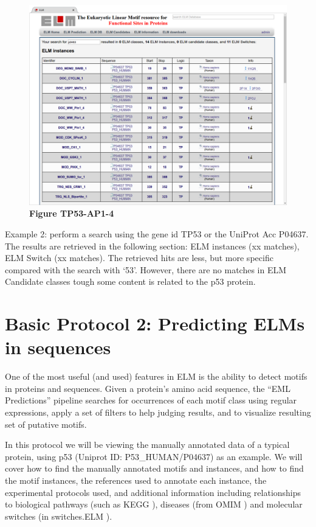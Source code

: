 \begin{figure}[h!]
\centering
\includegraphics[width=\textwidth]{Figures/TP53_3/P04637_instances.png} 
\caption{
\textbf{Figure TP53-AP1-4}
}
\end{figure}

Example 2: perform a search using the gene id TP53 or the UniProt Acc
P04637. The results are retrieved in the following section: ELM
instances (xx matches), ELM Switch (xx matches). The retrieved hits are
less, but more specific compared with the search with `53'. However,
there are no matches in ELM Candidate classes tough some content is
related to the p53 protein.

\section{Basic Protocol 2: Predicting ELMs in
sequences}\label{basic-protocol-2-predicting-elms-in-sequences}

One of the most useful (and used) features in ELM is the ability to
detect motifs in proteins and sequences. Given a protein's amino acid
sequence, the ``EML Predictions'' pipeline searches for occurrences of
each motif class using regular expressions, apply a set of filters to
help judging results, and to visualize resulting set of putative motifs.

In this protocol we will be viewing the manually annotated data of a
typical protein, using p53 (Uniprot ID: P53\_HUMAN/P04637) as an
example. We will cover how to find the manually annotated motifs and
instances, and how to find the motif instances, the references used to
annotate each instance, the experimental protocols used, and additional
information including relationships to biological pathways (such as KEGG
\cite{26476454}), diseases (from OMIM \cite{17357067}) and molecular
switches (in switches.ELM \cite{23550212}).

